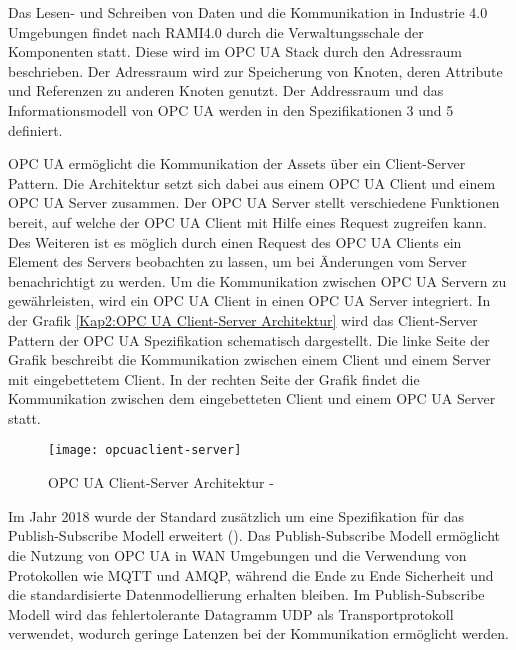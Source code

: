 \clearpage

Das Lesen- und Schreiben von Daten und die Kommunikation in Industrie 4.0 Umgebungen findet nach \ac{RAMI4.0} durch die Verwaltungsschale der Komponenten statt. Diese wird im \ac{OPC UA} Stack durch den Adressraum beschrieben. Der Adressraum wird zur Speicherung von Knoten, deren Attribute und Referenzen zu anderen Knoten genutzt. Der Addressraum und das Informationsmodell von \ac{OPC UA} werden in den Spezifikationen 3 \cite{opcpc3} und 5 \cite{opcpt5} definiert.

\ac{OPC UA} ermöglicht die Kommunikation der Assets über ein Client-Server Pattern. Die Architektur setzt sich dabei aus einem \ac{OPC UA} Client und einem \ac{OPC UA} Server zusammen. Der \ac{OPC UA} Server stellt verschiedene Funktionen bereit, auf welche der \ac{OPC UA} Client mit Hilfe eines Request zugreifen kann. Des Weiteren ist es möglich durch einen Request des \ac{OPC UA} Clients ein Element des Servers beobachten zu lassen, um bei Änderungen vom Server benachrichtigt zu werden. Um die Kommunikation zwischen \ac{OPC UA} Servern zu gewährleisten, wird ein \ac{OPC UA} Client in einen \ac{OPC UA} Server integriert. In der Grafik \autoref{Kap2:OPC UA Client-Server Architektur} wird das Client-Server Pattern der \ac{OPC UA} Spezifikation schematisch dargestellt. Die linke Seite der Grafik beschreibt die Kommunikation zwischen einem Client und einem Server mit eingebettetem Client. In der rechten Seite der Grafik findet die Kommunikation zwischen dem eingebetteten Client und einem \ac{OPC UA} Server statt.

\begin{figure}[h]
  \centering
  \texttt{[image: opcuaclient-server]}
  \caption{OPC UA Client-Server Architektur - \cite{opcpt1}} 
  \label{Kap2:OPC UA Client-Server Architektur}
\end{figure}

\clearpage

Im Jahr 2018 wurde der Standard zusätzlich um eine Spezifikation für das Publish-Subscribe Modell erweitert (\cite{hoppe2018}). Das Publish-Subscribe Modell ermöglicht die Nutzung von \ac{OPC UA} in \ac{WAN} Umgebungen und die Verwendung von Protokollen wie \ac{MQTT} und \ac{AMQP}, während die Ende zu Ende Sicherheit und die standardisierte Datenmodellierung erhalten bleiben. Im Publish-Subscribe Modell wird das fehlertolerante Datagramm \ac{UDP} als Transportprotokoll verwendet, wodurch geringe Latenzen bei der Kommunikation ermöglicht werden.

